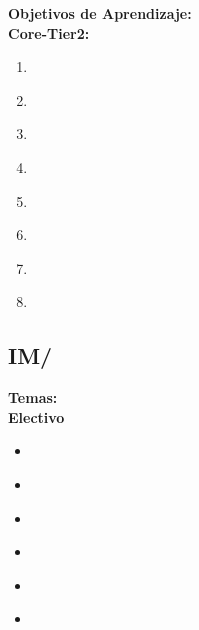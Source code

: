 \noindent \textbf{Objetivos de Aprendizaje:}\\
\noindent \textbf{Core-Tier2:}
\begin{enumerate}
	\setcounter{enumi}{0}
	\item \IMDataModelingLOCompareAndData\xspace[\IMDataModelingLOCompareAndDataLevel]\label{sec:BOK:IMDataModelingLOCompareAndData}
	\item \IMDataModelingLODescribeConcepts\xspace[\IMDataModelingLODescribeConceptsLevel]\label{sec:BOK:IMDataModelingLODescribeConcepts}
	\item \IMDataModelingLODefineTheUsed\xspace[\IMDataModelingLODefineTheUsedLevel]\label{sec:BOK:IMDataModelingLODefineTheUsed}
	\item \IMDataModelingLODescribeTheOfData\xspace[\IMDataModelingLODescribeTheOfDataLevel]\label{sec:BOK:IMDataModelingLODescribeTheOfData}
	\item \IMDataModelingLOApplyTheAnd\xspace[\IMDataModelingLOApplyTheAndLevel]\label{sec:BOK:IMDataModelingLOApplyTheAnd}
	\item \IMDataModelingLODescribeTheOfModel\xspace[\IMDataModelingLODescribeTheOfModelLevel]\label{sec:BOK:IMDataModelingLODescribeTheOfModel}
	\item \IMDataModelingLODescribeTheRelational\xspace[\IMDataModelingLODescribeTheRelationalLevel]\label{sec:BOK:IMDataModelingLODescribeTheRelational}
	\item \IMDataModelingLOGiveAEquivalent\xspace[\IMDataModelingLOGiveAEquivalentLevel]\label{sec:BOK:IMDataModelingLOGiveAEquivalent}
\end{enumerate}


\subsection{IM/\IMIndexing}\label{sec:BOK:IMIndexing}
\noindent \textbf{Temas:}\\
\noindent \textbf{Electivo}
\begin{itemize}
	\item \IMIndexingTopicThe\label{sec:BOK:IMIndexingTopicThe}
	\item \IMIndexingTopicTheBasic\label{sec:BOK:IMIndexingTopicTheBasic}
	\item \IMIndexingTopicKeeping\label{sec:BOK:IMIndexingTopicKeeping}
	\item \IMIndexingTopicCreating\label{sec:BOK:IMIndexingTopicCreating}
	\item \IMIndexingTopicIndexing\label{sec:BOK:IMIndexingTopicIndexing}
	\item \IMIndexingTopicIndexingThe\label{sec:BOK:IMIndexingTopicIndexingThe}
\end{itemize}


